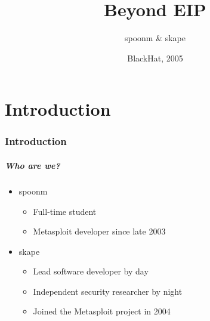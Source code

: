 \documentclass{beamer}
\title{Beyond EIP}
\author[spoonm \& skape] {spoonm \& skape}
\date[BlackHat 2005] {BlackHat, 2005}
\newenvironment{sitemize}{\vspace{1mm}\begin{itemize}\itemsep 4pt\small}{\end{itemize}}
\begin{document}
\begin{frame}[t]
  \titlepage
\end{frame}

\part{Introduction}

\section{Introduction}
\begin{frame}[t]
    \frametitle{Who are we?}

    \begin{sitemize}
        \item spoonm
        \begin{sitemize}
            \item Full-time student
            \item Metasploit developer since late 2003
        \end{sitemize}

        \item skape
        \begin{sitemize}
            \item Lead software developer by day
            \item Independent security researcher by night
            \item Joined the Metasploit project in 2004
        \end{sitemize}
    \end{sitemize}
\end{frame}
\end{document}

